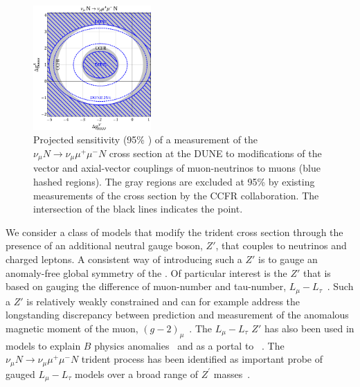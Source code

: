 \begin{figure}[tb!]
\centering
\includegraphics[width=0.4\textwidth]{graphics/model_independent_2.pdf}
\caption[$\nu_\mu N \to \nu_\mu \mu^+\mu^- N$ x-section at ND and mods of (axial-)vector coupling of \numu{}s to muons]
{Projected sensitivity (95\% ) of a measurement of the $\nu_\mu N \to \nu_\mu \mu^+\mu^- N$ cross section at the DUNE  to modifications of the vector and axial-vector couplings of muon-neutrinos to muons (blue hashed regions). The gray regions are excluded at 95\%  by existing measurements of the cross section by the CCFR collaboration. The intersection of the black lines indicates the  point.}
\label{fig:trident_gVgA}
\end{figure}

We consider a class of models that modify the trident cross section through the presence of an additional neutral gauge boson, $Z'$, that couples to neutrinos and charged leptons. A consistent way of introducing such a $Z'$ is to gauge an anomaly-free global symmetry of the . Of particular interest is the $Z'$ that is based on gauging the difference of muon-number and tau-number, $L_\mu - L_\tau$~\cite{He:1990pn,He:1991qd}. Such a $Z'$ is relatively weakly constrained and can for example address the longstanding discrepancy between  prediction and measurement of the anomalous magnetic moment of the muon, $(g-2)_\mu$~\cite{Baek:2001kca,Harigaya:2013twa}. The $L_\mu - L_\tau$ $Z'$ has also been used in models to explain $B$ physics anomalies~\cite{Altmannshofer:2014cfa} and as a portal to ~\cite{Baek:2008nz,Altmannshofer:2016jzy}. The $\nu_\mu N \to \nu_\mu \mu^+\mu^- N$ trident process has been identified as important probe of gauged $L_\mu - L_\tau$ models over a broad range of $Z^\prime$ masses~\cite{Altmannshofer:2014cfa,Altmannshofer:2014pba}.

